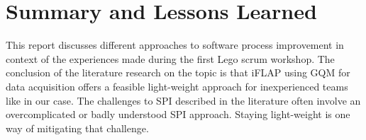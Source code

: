 \section{Summary and Lessons Learned}
\label{sec:summary}
This report discusses different approaches to software process improvement in context of the experiences made during the first Lego scrum workshop. The conclusion of the literature research on the topic is that iFLAP using GQM for data acquisition offers a feasible light-weight approach for inexperienced teams like in our case. The challenges to SPI described in the literature often involve an overcomplicated or badly understood SPI approach. Staying light-weight is one way of mitigating that challenge.